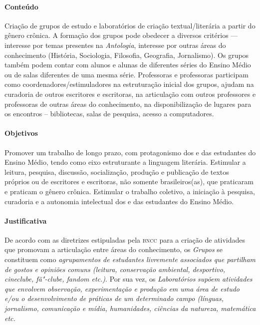 \documentclass[11pt]{extarticle}
\begin{document}
{{

\paragraph{Conteúdo} Criação de grupos de estudo e laboratórios de criação
textual/literária a partir do gênero crônica. A formação dos grupos pode
obedecer a diversos critérios --- interesse por temas presentes na
\emph{Antologia}, interesse por outras áreas do conhecimento (História,
Sociologia, Filosofia, Geografia, Jornalismo). Os grupos também podem
contar com alunos e alunas de diferentes séries do Ensino Médio ou de
salas diferentes de uma mesma série. Professoras e professoras
participam como coordenadores/estimuladores na estruturação inicial dos
grupos, ajudam na curadoria de outros escritores e escritoras, na
articulação com outros professores e professoras de outras áreas do
conhecimento, na disponibilização de lugares para os encontros --
bibliotecas, salas de pesquisa, acesso a computadores.

\paragraph{Objetivos} Promover um trabalho de longo prazo, com
protagonismo dos e das estudantes do Ensino Médio, tendo como eixo
estruturante a linguagem literária. Estimular a leitura, pesquisa,
discussão, socialização, produção e publicação de textos próprios ou de
escritores e escritoras, não somente brasileiros(as), que praticaram e
praticam o gênero crônica. Estimular o trabalho coletivo, a iniciação à
pesquisa, curadoria e a autonomia intelectual dos e das estudantes do
Ensino Médio.

\paragraph{Justificativa} De acordo com as diretrizes estipuladas pela
\textsc{bncc} para a criação de atividades que promovam a articulação entre áreas
do conhecimento, os \textit{Grupos} se constituem como
\emph{agrupamentos de estudantes livremente associados que partilham de
gostos e opiniões comuns (leitura, conservação ambiental, desportivo,
cineclube, fã"-clube, fandom etc.)}. Por sua vez, os
\textit{Laboratórios} \emph{supõem atividades que envolvem observação,
experimentação e produção em uma área de estudo e/ou o desenvolvimento
de práticas de um determinado campo (línguas, jornalismo, comunicação e
mídia, humanidades, ciências da natureza, matemática etc.}

}}
\end{document}
